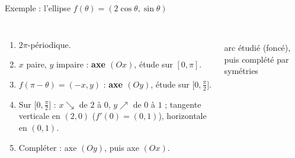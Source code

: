 \documentclass[aspectratio=169,11pt]{beamer}
\begin{document}
\begin{frame}{Exemple : l'ellipse $f(\theta)=(2\cos\theta,\sin\theta)$}
\begin{columns}[c]
\begin{enumerate}
\item $2\pi$-périodique.\pause
\item $x$ paire, $y$ impaire : \textbf{axe $(Ox)$}, étude sur $[0,\pi]$.\pause
\item $f(\pi-\theta)=(-x,y)$ : \textbf{axe $(Oy)$}, étude sur $\big[0,\frac\pi2\big]$.\pause
\item Sur $\big[0,\frac\pi2\big]$ : $x\searrow$ de $2$ à $0$, $y\nearrow$ de $0$ à $1$ ; tangente verticale en $(2,0)$
      ($f'(0)=(0,1)$), horizontale en $(0,1)$.\pause
\item Compléter : axe $(Oy)$, puis axe $(Ox)$.
\end{enumerate}
\centering{}
\\
{\scriptsize arc étudié (foncé), puis complété par symétries}
\end{columns}
\end{frame}
\end{document}
